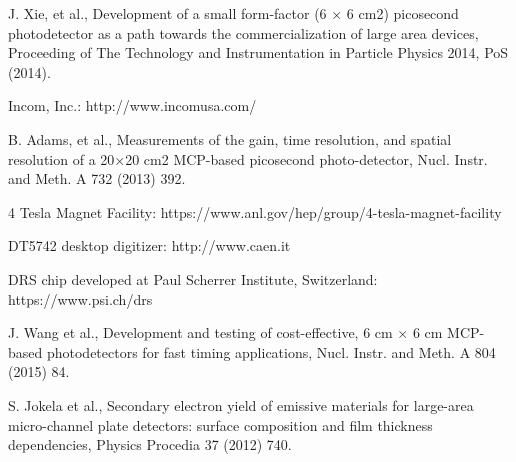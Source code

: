﻿\documentclass[preprint,5p]{elsarticle}
\begin{document}
\begin{thebibliography}{00}
J. Xie, et al., Development of a small form-factor (6 × 6 cm2) picosecond photodetector as a path towards the commercialization of large area devices, Proceeding of The Technology and Instrumentation in Particle Physics 2014, PoS (2014).

Incom, Inc.: http://www.incomusa.com/

B. Adams, et al., Measurements of the gain, time resolution, and spatial resolution of a 20×20 cm2 MCP-based picosecond photo-detector, Nucl. Instr. and Meth. A 732 (2013) 392.

4 Tesla Magnet Facility: https://www.anl.gov/hep/group/4-tesla-magnet-facility 

DT5742 desktop digitizer: http://www.caen.it

DRS chip developed at Paul Scherrer Institute, Switzerland: https://www.psi.ch/drs

J. Wang et al., Development and testing of cost-effective, 6 cm × 6 cm MCP-based photodetectors for fast timing applications, Nucl. Instr. and Meth. A 804 (2015) 84.

S. Jokela et al., Secondary electron yield of emissive materials for large-area micro-channel plate detectors: surface composition and film thickness dependencies, Physics Procedia 37 (2012) 740.


\end{thebibliography}
\end{document}
